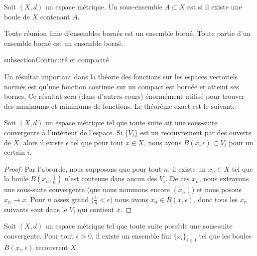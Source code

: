 \begin{definition}\label{DefEnsembleBorne}
	Soit \( (X, d) \) un espace métrique. Un sous-ensemble $A \subset X$ est  si il existe une boule de $X$ contenant $A$.
\end{definition}

\begin{proposition}     \label{PROPooJIOAooWqzKMu}
	Toute réunion finie d'ensembles bornés est un ensemble borné. Toute partie d'un ensemble borné est un ensemble borné.
\end{proposition}


subsection{Continuité et compacité}

Un résultat important dans la théorie des fonctions sur les espaces vectoriels normés est qu'une fonction continue sur un compact est bornée et atteint ses bornes. Ce résultat sera (dans d'autres cours) énormément utilisé pour trouver des maximums et minimums de fonctions. Le théorème exact est le suivant.

\begin{lemma}    \label{LemQFXOWyx}
	Soit \( (X,d)\) un espace métrique tel que toute suite ait une sous-suite convergente à l'intérieur de l'espace. Si \( \{ V_i \}\) est un recouvrement par des ouverts de \( X\), alors il existe \( \epsilon\) tel que pour tout \( x\in X\), nous ayons \( B(x,\epsilon)\subset V_i\) pour un certain \( i\).
\end{lemma}

\begin{proof}
	Par l'absurde, nous supposons que pour tout \( n\), il existe un \( x_n\in X\) tel que la boule \( B(x_n,\frac{1}{ n })\) n'est contenue dans aucun des \( V_i\). De ces \( x_n\), nous extrayons une sous-suite convergente (que nous nommons encore \( (x_n)\)) et nous posons \( x_n\to x\). Pour \( n\) assez grand (\( \frac{1}{ n }<\epsilon\)) nous avons \( x_n\in B(x,\epsilon)\), donc tous les \( x_n\) suivants sont dans le \( V_i\) qui contient \( x\).
\end{proof}

\begin{lemma}   \label{LemMGQqgDG}
	Soit \( (X,d)\) un espace métrique tel que toute suite possède une sous-suite convergente. Pour tout \( \epsilon>0\), il existe un ensemble fini \( \{ x_i \}_{i\in I}\) tel que les boules \( B(x_i,\epsilon)\) recouvrent \( X\).
\end{lemma}

